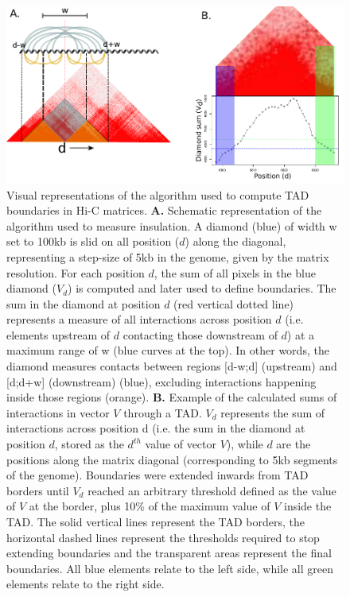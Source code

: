 \documentclass[11pt,a4paper]{report}
\begin{document}
\begin{figure}[ht]
	\includegraphics[width=1\textwidth]{Figures/6_interactions.pdf}
	\caption{Visual representations of the algorithm used to compute TAD boundaries in Hi-C matrices. \textbf{A.} Schematic representation of the algorithm used to measure insulation. A diamond (blue) of width w set to 100kb is slid on all position ($d$) along the diagonal, representing a step-size of 5kb in the genome, given by the matrix resolution. For each position $d$, the sum of all pixels in the blue diamond ($V_d$) is computed and later used to define boundaries. The sum in the diamond at position $d$ (red vertical dotted line) represents a measure of all interactions across position $d$ (i.e. elements upstream of $d$ contacting those downstream of $d$) at a maximum range of w (blue curves at the top). In other words, the diamond measures contacts between regions [d-w;d] (upstream) and [d;d+w] (downstream) (blue), excluding interactions happening inside those regions (orange). \textbf{B.} Example of the calculated sums of interactions in vector $V$ through a TAD. $V_d$ represents the sum of interactions across position d (i.e. the sum in the diamond at position $d$, stored as the $d^{th}$ value of vector $V$), while $d$ are the positions along the matrix diagonal (corresponding to 5kb segments of the genome). Boundaries were extended inwards from TAD borders until $V_d$ reached an arbitrary threshold defined as the value of $V$ at the border, plus 10\% of the maximum value of $V$ inside the TAD. The solid vertical lines represent the TAD borders, the horizontal dashed lines represent the thresholds required to stop extending boundaries and the transparent areas represent the final boundaries. All blue elements relate to the left side, while all green elements relate to the right side.}
	\label{interact_hic}
\end{figure}
\end{document}
